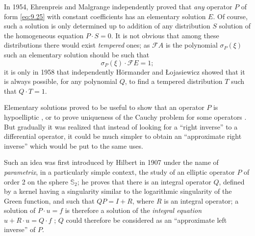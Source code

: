 \documentclass[12pt,a4paper,leqno,twoside]{extbook}
\newcommand{\Sph}{\mathbb{S}}
\begin{document}
In 1954, Ehrenpreis \cite{063} and Malgrange \cite{156} independently proved that \emph{any} operator \(P\) of form \eqref{eq:9.25} with constant coefficients has an elementary solution \(E\). Of course, such a solution is only determined up to addition of any distribution \(S\) solution of the homogeneous equation \(P \cdot S =0\). It is not obvious that among these distributions there would exist \emph{tempered} ones; as \(\mathcal{F}A\) is the polynomial \(\sigma_P(\xi)\) such an elementary solution should be such that
\begin{equation}
    \label{eq:9.32}
    \sigma_P(\xi) \cdot \mathcal{F}E = 1;
\end{equation}
it is only in 1958 that independently Hörmander \cite{118} and Łojasiewicz \cite{153} showed that it is always possible, for any polynomial \(Q\), to find a tempered distribution \(T\) such that \(Q \cdot T = 1\).

Elementary solutions proved to be useful to show that an operator \(P\) is hypoelliptic \cite[p.~100]{117}, or to prove uniqueness of the Cauchy problem for some operators \cite[p.~141]{117}. But gradually it was realized that instead of looking for a ``right inverse'' to a differential operator, it could be much simpler to obtain an ``approximate right inverse'' which would be put to the same uses.

Such an idea was first introduced by Hilbert in 1907 under the name of \emph{parametrix}, in a particularly simple context, the study of an elliptic operator \(P\) of order 2 on the sphere \(\Sph_2\); he proves that there is an integral operator \(Q\), defined by a kernel having a singularity similar to the logarithmic singularity of the Green function, and such that \(QP = I + R\), where \(R\) is an integral operator; a solution of \(P \cdot u = f\) is therefore a solution of the \emph{integral equation} \(u + R \cdot u = Q \cdot f\) \cite[p.~233--242]{112}; \(Q\) could therefore be considered as an ``approximate left inverse'' of \(P\).
\end{document}
